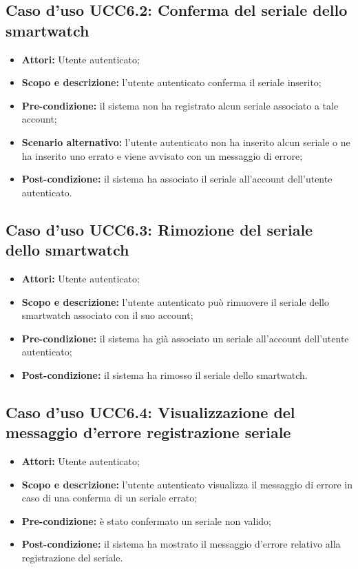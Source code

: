 \subsection{Caso d'uso UCC6.2: Conferma del seriale dello smartwatch}

\begin{itemize}
\item \textbf{Attori:} Utente autenticato;
\item \textbf{Scopo e descrizione:} l'utente autenticato conferma il seriale inserito;
\item \textbf{Pre-condizione:} il sistema non ha registrato alcun seriale associato a tale account;
\item \textbf{Scenario alternativo:} l'utente autenticato non ha inserito alcun seriale o ne ha inserito uno errato e viene avvisato con un messaggio di errore;
\item \textbf{Post-condizione:} il sistema ha associato il seriale all'account dell'utente autenticato.
\end{itemize}

\subsection{Caso d'uso UCC6.3: Rimozione del seriale dello smartwatch}

\begin{itemize}
\item \textbf{Attori:} Utente autenticato;
\item \textbf{Scopo e descrizione:} l'utente autenticato può rimuovere il seriale dello smartwatch associato con il suo account;
\item \textbf{Pre-condizione:} il sistema ha già associato un seriale all'account dell'utente autenticato;
\item \textbf{Post-condizione:} il sistema ha rimosso il seriale dello smartwatch.
\end{itemize}

\subsection{Caso d'uso UCC6.4: Visualizzazione del messaggio d'errore registrazione seriale}

\begin{itemize}
\item \textbf{Attori:} Utente autenticato;
\item \textbf{Scopo e descrizione:} l'utente autenticato visualizza il messaggio di errore in caso di una conferma di un seriale errato;
\item \textbf{Pre-condizione:} è stato confermato un seriale non valido;
\item \textbf{Post-condizione:} il sistema ha mostrato il messaggio d'errore relativo alla registrazione del seriale.
\end{itemize}


